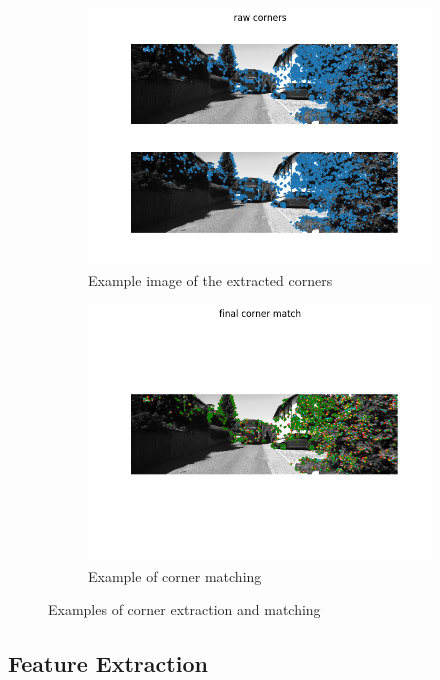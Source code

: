 \documentclass{article}
\begin{document}
\begin{figure}[h!]
	\begin{subfigure}{0.5\textwidth}
		\includegraphics[width=0.9\linewidth]{10_001157_001158_raw_corners}
		\caption{Example image of the extracted corners}
		\label{fig:ex_corners}
	\end{subfigure}
	\begin{subfigure}{0.5\textwidth}
		\includegraphics[width=0.9\linewidth]{10_001157_001158_final_matches}
		\caption{Example of corner matching}		
		\label{fig:ex_corner_matching}
	\end{subfigure}
	\caption{Examples of corner extraction and matching}
	\label{fig:ex_corner_and_matching}
\end{figure}

\subsection{Feature Extraction}\label{sec:features}
\end{document}
